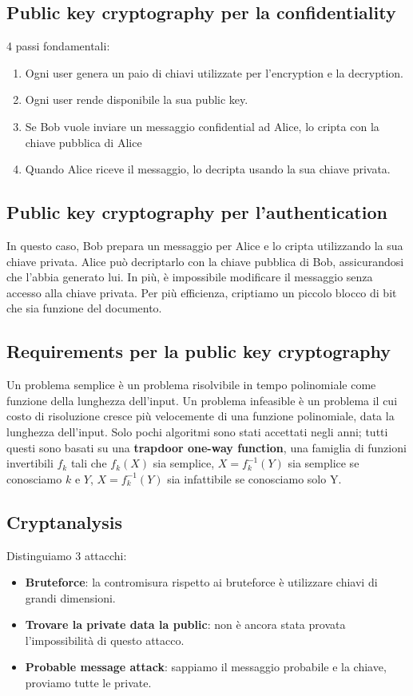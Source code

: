 \documentclass[11pt]{article}
\begin{document}
\subsection{Public key cryptography per la confidentiality}
4 passi fondamentali:
\begin{enumerate}
    \item Ogni user genera un paio di chiavi utilizzate per l'encryption e la decryption.
    \item Ogni user rende disponibile la sua public key.
    \item Se Bob vuole inviare un messaggio confidential ad Alice, lo cripta con la chiave pubblica di Alice
    \item Quando Alice riceve il messaggio, lo decripta usando la sua chiave privata.
\end{enumerate}
\subsection{Public key cryptography per l'authentication}
In questo caso, Bob prepara un messaggio per Alice e lo cripta utilizzando la sua chiave privata. Alice può decriptarlo con la chiave pubblica di Bob, assicurandosi che l'abbia generato lui. In più, è impossibile modificare il messaggio senza accesso alla chiave privata. Per più efficienza, criptiamo un piccolo blocco di bit che sia funzione del documento.
\subsection{Requirements per la public key cryptography}
Un problema semplice è un problema risolvibile in tempo polinomiale come funzione della lunghezza dell'input. Un problema infeasible è un problema il cui costo di risoluzione cresce più velocemente di una funzione polinomiale, data la lunghezza dell'input. Solo pochi algoritmi sono stati accettati negli anni; tutti questi sono basati su una \textbf{trapdoor one-way function}, una famiglia di funzioni invertibili $f_k$ tali che $f_k(X)$ sia semplice, $X=f_k^{-1}(Y)$ sia semplice se conosciamo $k$ e $Y$, $X=f_k^{-1}(Y)$ sia infattibile se conosciamo solo Y.
\subsection{Cryptanalysis}
Distinguiamo 3 attacchi:
\begin{itemize}
    \item \textbf{Bruteforce}: la contromisura rispetto ai bruteforce è utilizzare chiavi di grandi dimensioni. 
    \item \textbf{Trovare la private data la public}: non è ancora stata provata l'impossibilità di questo attacco. 
    \item \textbf{Probable message attack}: sappiamo il messaggio probabile e la chiave, proviamo tutte le private.
\end{itemize}
\end{document}
